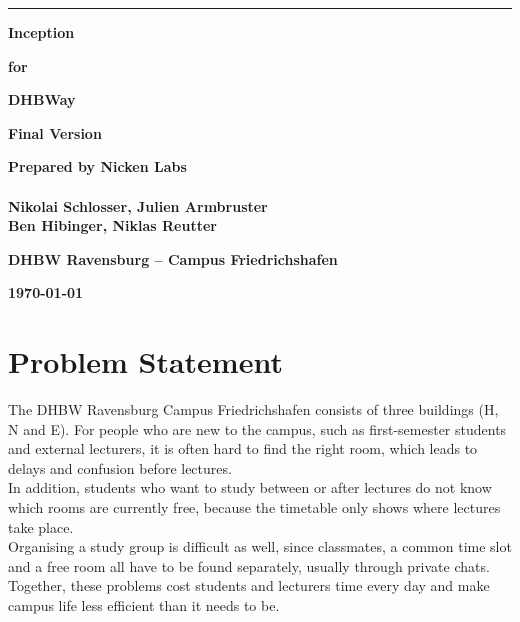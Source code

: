 \documentclass[11pt, a4paper]{article}
\newcommand{\projecttitle}{DHBWay}
\newcommand{\docversion}{Final Version}
\newcommand{\docauthor}{Nicken Labs \\ \vspace{0.5em} \\ Nikolai Schlosser, Julien Armbruster\\ Ben Hibinger, Niklas Reutter}
\newcommand{\docorg}{DHBW Ravensburg -- Campus Friedrichshafen}
\newcommand{\docdate}{\today}
\begin{document}
\begin{titlepage}
    \sffamily
    \noindent\rule{\textwidth}{3pt}
    \vspace{1.2cm}
    
    \begin{flushright}
        {\fontsize{28}{34}\selectfont\bfseries Inception\par}
        \vspace{1.2cm}
        {\Large\bfseries for\par}
        \vspace{1.2cm}
        {\fontsize{24}{30}\selectfont\bfseries \projecttitle\par}
        \vspace{1.8cm}
        {\large\bfseries \docversion\par}
        \vspace{1.2cm}
        {\large\bfseries Prepared by \docauthor\par}
        \vspace{1.2cm}
        {\large\bfseries \docorg\par}
        \vspace{1.2cm}
        {\large\bfseries \docdate\par}
    \end{flushright}
\end{titlepage}

\section{Problem Statement}
The DHBW Ravensburg Campus Friedrichshafen consists of three buildings (H, N and E).
For people who are new to the campus, such as first-semester students and external
lecturers, it is often hard to find the right room, which leads to delays and
confusion before lectures.\\
In addition, students who want to study between or after lectures do not know which
rooms are currently free, because the timetable only shows where lectures take place.\\
Organising a study group is difficult as well, since classmates, a common time slot and
a free room all have to be found separately, usually through private chats.\\
Together, these problems cost students and lecturers time every day and make campus
life less efficient than it needs to be.
\end{document}
